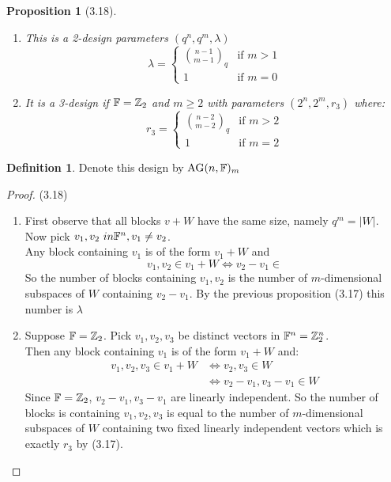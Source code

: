 \documentclass[]{article}
\newtheorem{prop}[thm]{Proposition}
\theoremstyle{definition}
\newtheorem*{defn}{Definition}
\theoremstyle{remark}
\numberwithin{equation}{section}
\begin{document}
			\begin{prop}[3.18]\hfill\\
				\begin{enumerate}
					\item This is a 2-design parameters $(q^n, q^m, \lambda)$
						\[
							\lambda =
								  \begin{cases}
								   \binom{n-1}{m-1}_q & \text{if } m > 1 \\
								   1       & \text{if } m = 0
								  \end{cases}
						\]
					\item It is a 3-design if $\mathbb F = \mathbb{Z}_2$ and $m \geq 2$ with parameters $(2^n, 2^m, r_3)$ where:
					\[
						r_3 = 	\begin{cases}
								   \binom{n-2}{m-2}_q & \text{if } m > 2 \\
								   1       & \text{if } m = 2
								\end{cases}
					\]
				\end{enumerate}
			\end{prop}

			\begin{defn}
				Denote this design by $\text{AG}(n, \mathbb F)_m$
			\end{defn}

			\begin{proof}(3.18)\hfill
				\begin{enumerate}
					\item First observe that all blocks $v + W$ have the same size, namely $q^m = |W|$.\\
						Now pick $v_1, v_2 \ in \mathbb F^n, v_1 \neq v_2$. \\
						Any block containing $v_1$ is of the form $v_1 + W$ and
						\[
							v_1, v_2 \in v_1 + W \iff v_2 - v_1 \in
						\]
						So the number of blocks containing $v_1, v_2$ is the number of $m$-dimensional subspaces of $W$ containing $v_2 - v_1$.
						By the previous proposition (3.17) this number is $\lambda$

					\item Suppose $\mathbb F = \mathbb{Z}_2$. Pick $v_1, v_2, v_3$ be distinct vectors in $\mathbb F^n = \mathbb{Z}_2^n$. \\
					Then any block containing $v_1$ is of the form $v_1 + W$ and:
					\begin{align*}
						v_1, v_2, v_3 \in v_1 + W &\iff v_2, v_3 \in W\\
												  &\iff v_2 - v_1, v_3 - v_1 \in W
					\end{align*}
					Since $\mathbb F = \mathbb{Z}_2$, $v_2 - v_1, v_3-v_1$ are linearly independent. So the number of blocks is containing $v_1, v_2, v_3$ is equal to the number of $m$-dimensional subspaces of $W$ containing two fixed linearly independent vectors which is exactly $r_3$ by (3.17).
				\end{enumerate}
			\end{proof}
\end{document}

